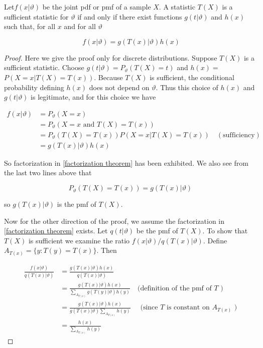 \documentclass[ 11pt,%
				a4paper,%
				twoside,%
				headinclude,%
				footinclude = true,%
				cleardoublepage = empty,%
				reqno]{scrbook}
\begin{document}
\begin{theorem}
Let$f({x} | \vartheta)$ be the joint pdf or pmf of a sample $X$. A statistic $T({X})$ is a sufficient statistic for $\vartheta$ if and only if there exist functions $g(t | \vartheta)$ and $h({x})$ such that, for all ${x}$ and for all $\vartheta$

\begin{equation}
~\label{factorization theorem}
 f({x} | \vartheta)=g(T({x}) | \vartheta) h({x}) 
\end{equation}


\begin{proof}
Here we give the proof only for discrete distributions. Suppose $T({X})$ is a sufficient statistic. Choose $g(t | \vartheta) = P_{\vartheta}(T({X})=t)$ and $h({x})=$ $P({X}={x} | T({X})=T({x})) .$ Because $T({X})$ is sufficient, the conditional probability defining $h({x})$ does not depend on $\vartheta .$ Thus this choice of $h({x})$ and $g(t | \vartheta)$ is legitimate, and for this choice we have

\[
\begin{aligned}
f({x} | \vartheta) &=P_{\vartheta}({X}={x}) \\
&=P_{\vartheta}({X}={x} \text { and } T({X})=T({x})) \\
&=P_{\vartheta}(T({X})=T({x})) P({X}={x} | T({X})=T({x}))\quad(\text{sufficiency})\\
&=g(T({x}) | \vartheta) h({x})
\end{aligned} 
\]

So factorization in \eqref{factorization theorem} has been exhibited. We also see from the last two lines above that

\[
P_{\vartheta}(T({X})=T({x}))=g(T({x}) | \vartheta)
\]

so $g(T({x}) | \vartheta)$ is the pmf of $T({X})$.

 Now for the other direction of the proof, we assume the factorization in \eqref{factorization theorem} exists. Let $q\left(t| \vartheta\right)$ be the pmf of $T({X})$. To show that $T({X})$ is sufficient we examine the ratio $f({x} | \vartheta) / q(T({x}) | \vartheta)$. Define $A_{T({x})}= \{y: T(y)=T(x)\}$. Then

\begin{equation*}\begin{aligned}
\frac{f(x | \vartheta)}{q(T(x) | \vartheta)} &=\frac{g(T(x) | \vartheta) h(x)}{q(T(x) | \vartheta)} \\
&=\frac{g(T(x) | \vartheta) h(x)}{\sum_{A_{T(x)}} g(T(y) | \vartheta) h(y)} \quad \text{(definition of the pmf of } T \text{ )} \\
&=\frac{g(T(x) | \vartheta) h(x)}{g(T(x) | \vartheta) \sum_{A_{T(x)}} h(y)} \quad \text{ (since } T \text { is constant on } A_{T(x)}\text{ )}\\
&=\frac{h(x)}{\sum_{A_{T(x)}} h(y)}
\end{aligned}\end{equation*}


\end{proof}
\end{theorem}
\end{document}
